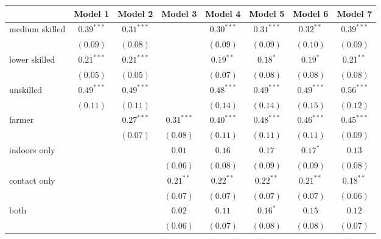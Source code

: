 
\begin{table}[h!]
\begin{center}
\begin{tabular}{l c c c c c c c}
\hline
 & Model 1 & Model 2 & Model 3 & Model 4 & Model 5 & Model 6 & Model 7 \\
\hline
medium skilled & $0.39^{***}$ & $0.31^{***}$ &              & $0.30^{***}$ & $0.31^{***}$  & $0.32^{**}$   & $0.39^{***}$  \\
               & $(0.09)$     & $(0.08)$     &              & $(0.09)$     & $(0.09)$      & $(0.10)$      & $(0.09)$      \\
lower skilled  & $0.21^{***}$ & $0.21^{***}$ &              & $0.19^{**}$  & $0.18^{*}$    & $0.19^{*}$    & $0.21^{**}$   \\
               & $(0.05)$     & $(0.05)$     &              & $(0.07)$     & $(0.08)$      & $(0.08)$      & $(0.08)$      \\
unskilled      & $0.49^{***}$ & $0.49^{***}$ &              & $0.48^{***}$ & $0.49^{***}$  & $0.49^{***}$  & $0.56^{***}$  \\
               & $(0.11)$     & $(0.11)$     &              & $(0.14)$     & $(0.14)$      & $(0.15)$      & $(0.12)$      \\
farmer         &              & $0.27^{***}$ & $0.31^{***}$ & $0.40^{***}$ & $0.48^{***}$  & $0.46^{***}$  & $0.45^{***}$  \\
               &              & $(0.07)$     & $(0.08)$     & $(0.11)$     & $(0.11)$      & $(0.11)$      & $(0.09)$      \\
indoors only   &              &              & $0.01$       & $0.16$       & $0.17$        & $0.17^{*}$    & $0.13$        \\
               &              &              & $(0.06)$     & $(0.08)$     & $(0.09)$      & $(0.09)$      & $(0.08)$      \\
contact only   &              &              & $0.21^{**}$  & $0.22^{**}$  & $0.22^{**}$   & $0.21^{**}$   & $0.18^{**}$   \\
               &              &              & $(0.07)$     & $(0.07)$     & $(0.07)$      & $(0.07)$      & $(0.06)$      \\
both           &              &              & $0.02$       & $0.11$       & $0.16^{*}$    & $0.15$        & $0.12$        \\
               &              &              & $(0.06)$     & $(0.07)$     & $(0.08)$      & $(0.08)$      & $(0.07)$      \\

\end{tabular}
\end{center}
\end{table}
